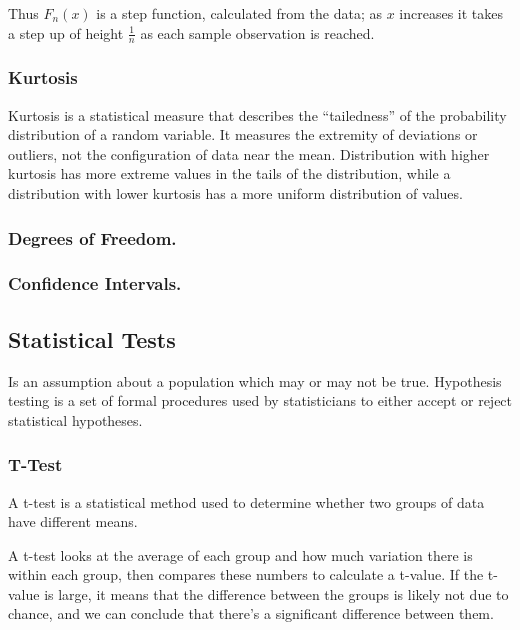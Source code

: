\documentclass[11pt]{article}
\begin{document}
Thus \(F_n(x)\) is a step function, calculated from the data; as \(x\)
increases it takes a step up of height \(\frac{1}{n}\) as each sample
observation is reached.


\hypertarget{kurtosis}{%
\subsubsection{Kurtosis}\label{kurtosis}}

Kurtosis is a statistical measure that describes the ``tailedness'' of
the probability distribution of a random variable. It measures the
extremity of deviations or outliers, not the configuration of data near
the mean. Distribution with higher kurtosis has more extreme values in
the tails of the distribution, while a distribution with lower kurtosis
has a more uniform distribution of values.

\hypertarget{degrees-of-freedom.}{%
\subsubsection{Degrees of
Freedom.}\label{degrees-of-freedom.}}

\hypertarget{confidence-intervals.}{%
\subsubsection{Confidence Intervals.}\label{confidence-intervals.}}

\hypertarget{statistical-tests}{%
\subsection{Statistical Tests}\label{statistical-tests}}

Is an assumption about a population which may or may not be true.
Hypothesis testing is a set of formal procedures used by statisticians
to either accept or reject statistical hypotheses.

\hypertarget{t-test}{%
\subsubsection{T-Test}\label{t-test}}

A t-test is a statistical method used to determine whether two groups of
data have different means.

A t-test looks at the average of each group and how much variation there
is within each group, then compares these numbers to calculate a
t-value. If the t-value is large, it means that the difference between
the groups is likely not due to chance, and we can conclude that there's
a significant difference between them.
\end{document}
